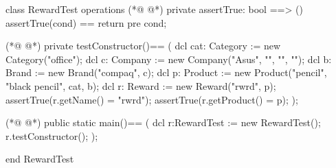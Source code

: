 \begin{vdmpp}[breaklines=true]
class RewardTest
 operations
(*@
\label{assertTrue:3}
@*)
  private assertTrue: bool ==> ()
    assertTrue(cond) == return
    pre cond;
    
(*@
\label{testConstructor:7}
@*)
  private testConstructor()==
  (
    dcl cat: Category := new Category("office");
   dcl c: Company := new Company("Asus", "", "", "");
   dcl b: Brand := new Brand("compaq", c);
    dcl p: Product := new Product("pencil", "black pencil", cat, b);
   dcl r: Reward := new Reward("rwrd", p);
   assertTrue(r.getName() = "rwrd");
   assertTrue(r.getProduct() = p);
  );
 
(*@
\label{main:18}
@*)
  public static main()==
    (
   dcl r:RewardTest := new RewardTest();
   r.testConstructor();
    );

end RewardTest
\end{vdmpp}
